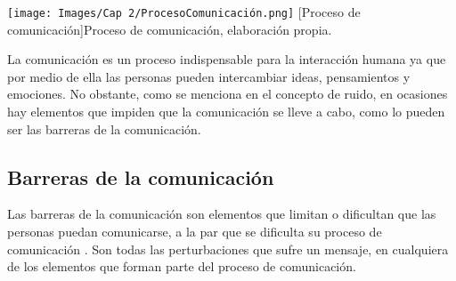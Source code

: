 \begin{center}
    \texttt{[image: Images/Cap 2/ProcesoComunicación.png]}
    [Proceso de comunicación]{Proceso de comunicación, elaboración propia.} 
\end{center}


La comunicación es un proceso indispensable para la interacción humana ya que por medio de ella las personas pueden intercambiar ideas, pensamientos y emociones. No obstante, como se menciona en el concepto de ruido, en ocasiones hay elementos que impiden que la comunicación se lleve a cabo, como lo pueden ser las barreras de la comunicación.

\newpage
\subsection{Barreras de la comunicación}
Las barreras de la comunicación son elementos que limitan o dificultan que las personas puedan comunicarse, a la par que se dificulta su proceso de comunicación \cite{ref2}. Son todas las perturbaciones que sufre un mensaje, en cualquiera de los elementos que forman parte del proceso de comunicación.\\

